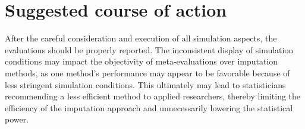 \documentclass[bimj,fleqn]{w-art}
\begin{document}



% 





\section{Suggested course of action}

After the careful consideration and execution of all simulation aspects, the evaluations should be properly reported. The inconsistent display of simulation conditions may impact the objectivity of meta-evaluations over imputation methods, as one method's performance may appear to be favorable because of less stringent simulation conditions. This ultimately may lead to statisticians recommending a less efficient method to applied researchers, thereby limiting the efficiency of the imputation approach and unnecessarily lowering the statistical power.
\end{document}
